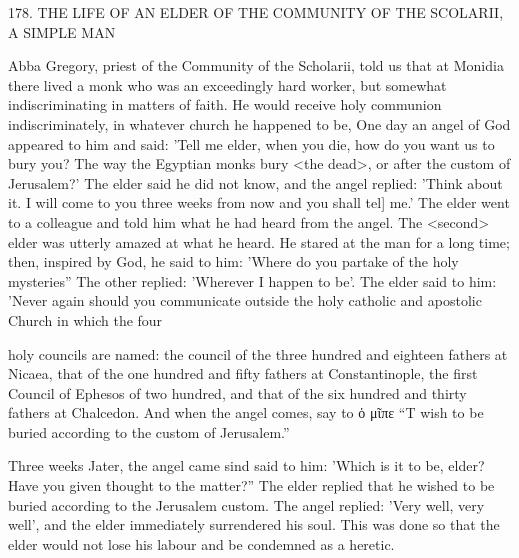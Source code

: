 178.
THE LIFE OF AN ELDER OF THE
COMMUNITY OF THE SCOLARII, A SIMPLE MAN

Abba Gregory, priest of the Community of the Scholarii, told us
that at Monidia there lived a monk who was an exceedingly hard
worker, but somewhat indiscriminating in matters of faith.
He
would receive holy communion indiscriminately, in whatever church
he happened to be, One day an angel of God appeared to him and
said: 'Tell me elder, when you die, how do you want us to bury
you? The way the Egyptian monks bury <the dead>, or after the
custom of Jerusalem?' The elder said he did not know, and the
angel replied: 'Think about it.
I will come to you three weeks from
now and you shall tel] me.' The elder went to a colleague and told
him what he had heard from the angel.
The <second> elder was
utterly amazed at what he heard.
He stared at the man for a long
time; then, inspired by God, he said to him: 'Where do you partake
of the holy mysteries” The other replied: 'Wherever I happen to be'.
The elder said to him: 'Never again should you communicate
outside the holy catholic and apostolic Church in which the four

 

holy councils are named: the council of the three hundred and
eighteen fathers at Nicaea, that of the one hundred and fifty fathers
at Constantinople, the first Council of Ephesos of two hundred, and
that of the six hundred and thirty fathers at Chalcedon.
And when
the angel comes, say to ὁ μῖπε “T wish to be buried according to the
custom of Jerusalem.”

Three weeks Jater, the angel came sind said to him: 'Which is it
to be, elder? Have you given thought to the matter?” The elder
replied that he wished to be buried according to the Jerusalem
custom.
The angel replied: 'Very well, very well', and the elder
immediately surrendered his soul.
This was done so that the elder
would not lose his labour and be condemned as a heretic.

